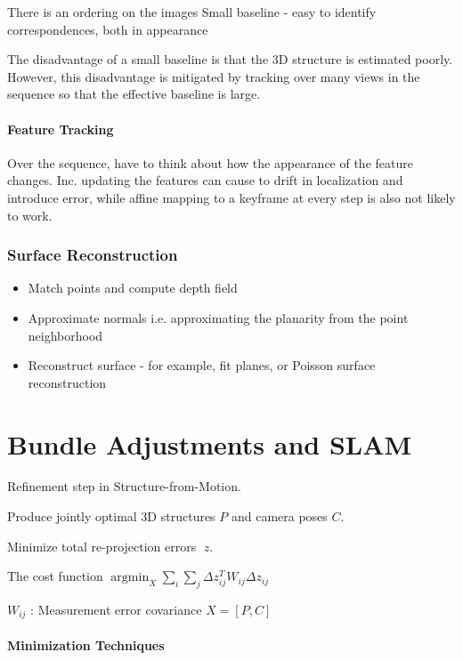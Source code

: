 There is an ordering on the images
Small baseline - easy to identify correspondences, both in appearance 

The disadvantage of a small baseline is that the 3D structure is estimated poorly. However, this disadvantage is mitigated by tracking over many views in the sequence so that the effective baseline is large.


\paragraph{Feature Tracking}

Over the sequence, have to think about how the appearance of the feature changes.
Inc. updating the features can cause to drift in localization and introduce error, while affine mapping to a keyframe at every step is also not likely to work.


\subsubsection{Surface Reconstruction}

\begin{itemize}
\item Match points and compute depth field
\item Approximate normals i.e. approximating the planarity from the point neighborhood
\item  Reconstruct surface - for example, fit planes, or Poisson surface reconstruction
\end{itemize}

\section{Bundle Adjustments and SLAM}

Refinement step in Structure-from-Motion.

Produce jointly optimal 3D structures $P$ and camera poses $C$.

Minimize total re-projection errors 􏰅$z$.

The cost function $\operatorname{argmin}_X \sum_i \sum_j \Delta z_{ij}^T W_{ij} \Delta z_{ij} $

$W_{ij}$ : Measurement error covariance
$X = [P,C]$


\paragraph{Minimization Techniques}

